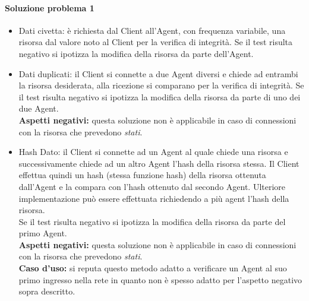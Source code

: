 \documentclass[]{article}
\begin{document}
		\paragraph{Soluzione problema 1}
			\begin{itemize}
				\item Dati civetta: è richiesta dal Client all'Agent, con frequenza variabile, una risorsa dal valore noto al Client per la verifica di integrità. Se il test risulta negativo si ipotizza la modifica della risorsa da parte dell'Agent.
				\item Dati duplicati: il Client si connette a due Agent diversi e chiede ad entrambi la risorsa desiderata, alla ricezione si comparano per la verifica di integrità. Se il test risulta negativo si ipotizza la modifica della risorsa da parte di uno dei due Agent.\\
				\textbf{Aspetti negativi:} questa soluzione non è applicabile in caso di connessioni con la risorsa che prevedono \textit{stati}.
				\item Hash Dato: il Client si connette ad un Agent al quale chiede una risorsa e successivamente chiede ad un altro Agent l'hash della risorsa stessa. Il Client effettua quindi un hash (stessa funzione hash) della risorsa ottenuta dall'Agent e la compara con l'hash ottenuto dal secondo Agent. Ulteriore implementazione può essere effettuata richiedendo a più agent l'hash della risorsa.\\
				Se il test risulta negativo si ipotizza la modifica della risorsa da parte del primo Agent.\\
				\textbf{Aspetti negativi:} questa soluzione non è applicabile in caso di connessioni con la risorsa che prevedono \textit{stati}.\\
				\textbf{Caso d'uso:} si reputa questo metodo adatto a verificare un Agent al suo primo ingresso nella rete in quanto non è spesso adatto per l'aspetto negativo sopra descritto.		
			\end{itemize}
			
\end{document}
